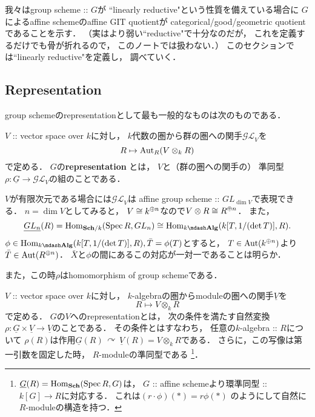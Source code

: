\documentclass[a4paper]{jsarticle}
\newcommand{\Sch}{\mathbf{Sch}}
\newcommand{\Alg}{\mathbf{Alg}}
\newcommand{\func}[1]{\underline{#1}}
\newcommand{\ftorGL}{\mathcal{GL}}
\newcommand{\acton}{\,\curvearrowright\,}
\newcommand{\GL}{GL}
\begin{document}
    我々はgroup scheme :: $G$が
    ``linearly reductive"という性質を備えている場合に
    $G$によるaffine schemeのaffine GIT quotientが
    categorical/good/geometric quotientであることを示す．
    （実はより弱い``reductive"で十分なのだが，
    これを定義するだけでも骨が折れるので，
    このノートでは扱わない．）
    このセクションでは``linearly reductive"を定義し，
    調べていく．

    \subsection{Representation} 
    group schemeのrepresentationとして最も一般的なものは次のものである．
    \begin{Def}
        $V$ :: vector space over $k$に対し，
        $k$代数の圏から群の圏への関手$\ftorGL_V$を
        \[ R \mapsto \operatorname{Aut}_R(V \otimes_k R) \]
        で定める．
        $G$の\textbf{representation} とは，
        $V$と（群の圏への関手の）
        準同型$\rho: \func{G} \to \ftorGL_V$の組のことである．
    \end{Def}
    \begin{Remark}
        $V$が有限次元である場合には$\ftorGL_V$は
        affine group scheme :: $GL_{\dim V}$で表現できる．
        $n=\dim V$としてみると，
        $V \cong k^{\oplus n}$なので$V \otimes R \cong R^{\oplus n}$．
        また，
        \[
            \func{GL_n}(R)
            =\Hom_{\Sch/k}(\Spec R, \GL_n)
            \iso \Hom_{k\mdash\Alg}(k[T, 1/(\det T)], R).
        \]
        $\phi \in \Hom_{k\mdash\Alg}(k[T, 1/(\det T)], R), \bar{T}=\phi(T)$とすると，
        $T \in \operatorname{Aut}(k^{\oplus n})$より$\bar{T} \in \operatorname{Aut}(R^{\oplus n})$．
        $\bar{X}$と$\phi$の間にあるこの対応が一対一であることは明らか．

        また，この時$\rho$はhomomorphism of group schemeである．
    \end{Remark}

    \begin{Def}
        $V$ :: vector space over $k$に対し，
        $k$-algebraの圏からmoduleの圏への関手$\func{V}$を
        \[ R \mapsto V \otimes_k R \]
        で定める．
        $G$の$V$へのrepresentationとは，
        次の条件を満たす自然変換
        $\rho: \func{G} \times \func{V} \to \func{V}$のことである．
        その条件とはすなわち，
        任意の$k$-algebra :: $R$について
        $\rho(R)$は作用$\func{G}(R) \acton \func{V}(R)=V \otimes_k R$である．
        さらに，この写像は第一引数を固定した時，
        $R$-moduleの準同型である
        \footnote
        {
            $\func{G}(R)=\Hom_{\Sch}(\Spec R, G)$は，
            $G$ :: affine schemeより環準同型 :: $k[G] \to R$に対応する．
            これは$(r \cdot \phi)(*)=r \phi(*)$
            のようにして自然に$R$-moduleの構造を持つ．
        }．
    \end{Def}
\end{document}

